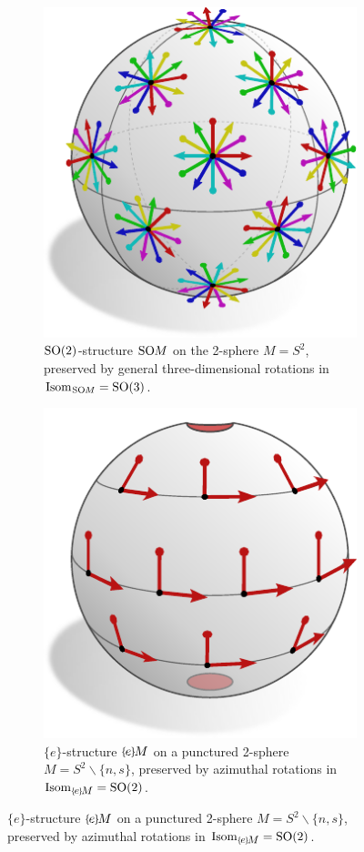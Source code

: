 \begin{figure}
    \centering
    \begin{subfigure}[b]{0.48\textwidth}
        \centering
        \includegraphics[width=.66\textwidth]{figures/G_structure_S2_1.pdf}
        \captionsetup{format=hang, width=.9\textwidth}
        \caption{\small
            $\operatorname{SO}(2)$-structure $\operatorname{SO}\mkern-3.6muM$ on the 2-sphere $M=S^2$, preserved by general three-dimensional rotations in $\operatorname{Isom}_{\mkern1mu\operatorname{SO}\mkern-3.6muM} = \operatorname{SO}(3)$.
        }
        \label{fig:G_structure_S2_1}
    \end{subfigure}
    \hfill
    \begin{subfigure}[b]{0.48\textwidth}
        \centering
        \includegraphics[width=.66\textwidth]{figures/G_structure_S2_2.pdf}
        \captionsetup{format=hang, width=.9\textwidth}
        \caption{\small
            $\{e\}$-structure $\eM$ on a punctured 2-sphere $M = S^2 \backslash \{n,s\}$, preserved by azimuthal rotations in $\IsomeM = \SO2$.
}
\end{subfigure}
\end{figure}
